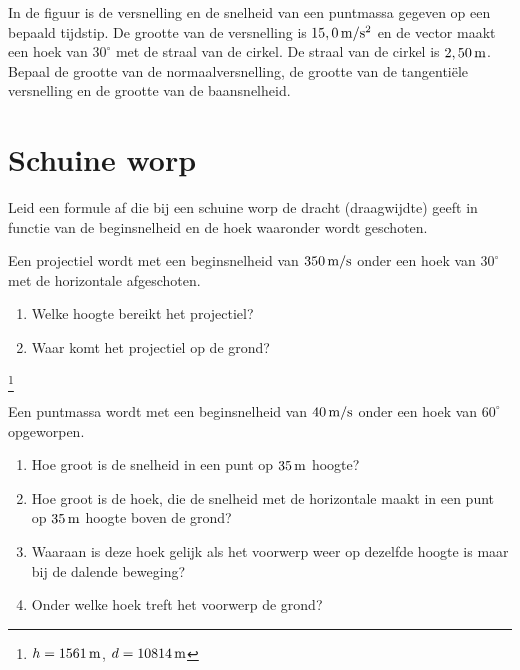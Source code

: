 \begin{exercise} In de figuur is de versnelling en de snelheid van een puntmassa gegeven op een bepaald tijdstip. De grootte van de versnelling is $15,0\rm\,m/s^2$ en de vector maakt een hoek van $30^\circ$ met de straal van de cirkel. De straal van de cirkel is $2,50\rm\,m$. Bepaal de grootte van de normaalversnelling, de grootte van de tangenti\"ele versnelling en de grootte van de baansnelheid.




\cleardoublepage

\section{Schuine worp}

\end{exercise}

\begin{exercise} Leid een formule af die bij een schuine worp de dracht
(draagwijdte) geeft in functie van de beginsnelheid en de hoek
waaronder wordt geschoten.

\end{exercise}

\begin{exercise} Een projectiel wordt met een beginsnelheid van $350\rm\,m/s$
onder een hoek van $30^\circ$ met de horizontale afgeschoten.
\begin{enumerate}
\item Welke hoogte bereikt het projectiel?
\item Waar komt het projectiel op de grond?
\end{enumerate}
\footnote{$h=1561\rm\,m$, $d=10814\rm\,m$}

\end{exercise}

\begin{exercise} Een puntmassa wordt met een beginsnelheid van $40\rm\,m/s$
onder een hoek van $60^{\circ}$ opgeworpen.
\begin{enumerate}
\item Hoe groot is de snelheid in een punt op $35\rm\,m$ hoogte?
\item Hoe groot is de hoek, die de snelheid met de horizontale maakt in een punt
op $35\rm\,m$ hoogte boven de grond?
\item Waaraan is deze hoek gelijk als het voorwerp weer op dezelfde
hoogte is maar bij de dalende beweging?
\item Onder welke hoek treft het voorwerp de grond?
\end{enumerate}

\end{exercise}

